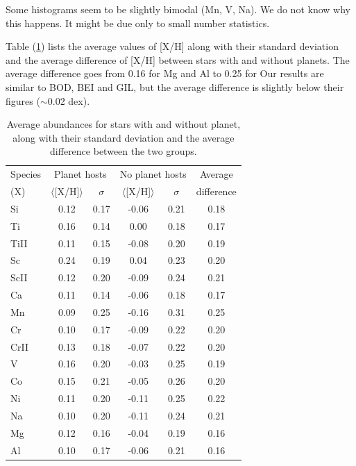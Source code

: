 \documentclass[dvips,12pt,a4paper]{report}
\begin{document}
{{Some histograms seem to be slightly bimodal (Mn, V, Na). We do not know why this happens. It might be due only to small number statistics. 

Table (\ref{avgabund}) lists the average values of [X/H] along with their standard deviation and the average difference of [X/H] between stars with and without planets. The average difference goes from 0.16 for Mg and Al to 0.25 for %
Our results are similar to BOD, BEI and GIL, but the average difference is slightly below their figures ($\sim$0.02 dex).

\begin{table}[h!]\footnotesize
\label {avgabund}
\centering
\caption[Average abundances for stars with and with planets ]{Average abundances for stars with and without planet, along with their standard deviation and the average difference between the two groups.} 
\begin{tabular}{ l c c c c c}

\hline
\hline 
Species & \multicolumn {2}{c}{Planet hosts} & \multicolumn {2}{c}{No planet hosts} & Average  \\
(X) & $\langle$[X/H]$\rangle$ & $\sigma$ & $\langle$[X/H]$\rangle$ & $\sigma$ & difference \\
\hline
          Si & 0.12 & 0.17 & -0.06 & 0.21 & 0.18 \\
          Ti & 0.16 & 0.14 & 0.00 & 0.18 & 0.17 \\
        TiII & 0.11 & 0.15 & -0.08 & 0.20 & 0.19\\
          Sc & 0.24 & 0.19 & 0.04 & 0.23 & 0.20\\
        ScII & 0.12 & 0.20 & -0.09 & 0.24 & 0.21\\
          Ca & 0.11 & 0.14 & -0.06 & 0.18 & 0.17\\
          Mn & 0.09 & 0.25 & -0.16 & 0.31 & 0.25\\
          Cr & 0.10 & 0.17 & -0.09 & 0.22 & 0.20\\
        CrII & 0.13 & 0.18 & -0.07 & 0.22 & 0.20\\
           V & 0.16 & 0.20 & -0.03 & 0.25 & 0.19\\
          Co & 0.15 & 0.21 & -0.05 & 0.26 & 0.20\\
          Ni & 0.11 & 0.20 & -0.11 & 0.25 & 0.22\\
          Na & 0.10 & 0.20 & -0.11 & 0.24 & 0.21\\
          Mg & 0.12 & 0.16 & -0.04 & 0.19 & 0.16\\
          Al & 0.10 & 0.17 & -0.06 & 0.21 & 0.16\\
\hline


\end{tabular}
\end{table}}}
\end{document}
